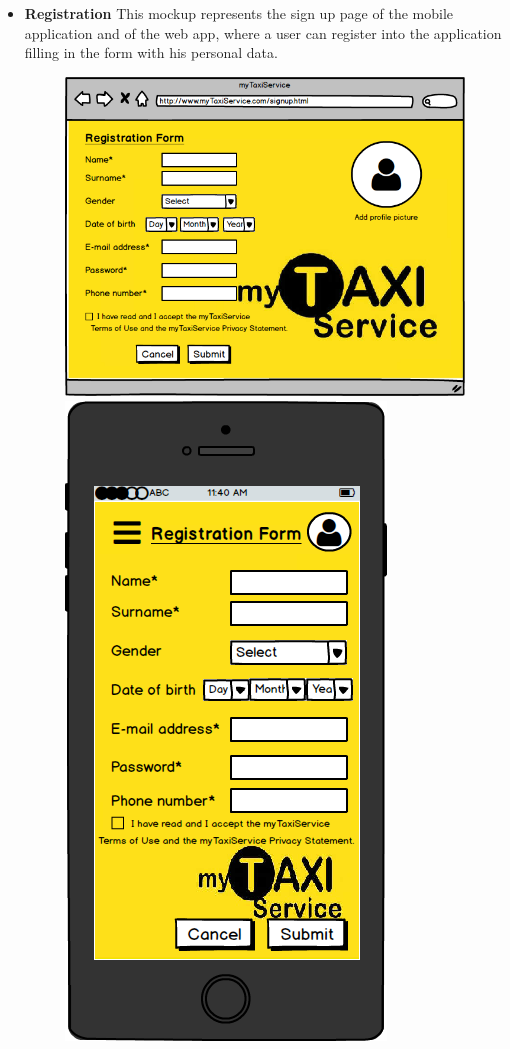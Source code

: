 \documentclass[18pt,oneside,a4paper, titlepage]{article}
\begin{document}
\begin{itemize}
\begin{figure}[h]
				\end{figure}
				\\
				\item \textbf{Registration} This mockup represents the sign up page of the mobile application and of the web app, where a user can register into the application filling in the form with his personal data.\\
				\begin{figure}[h]
					\includegraphics[scale=0.3]{WebAppRegistration.png}%
					\qquad\qquad
					\includegraphics[scale=0.3]{MobileAppRegistration.png}

\end{figure}
\end{itemize}
\end{document}
